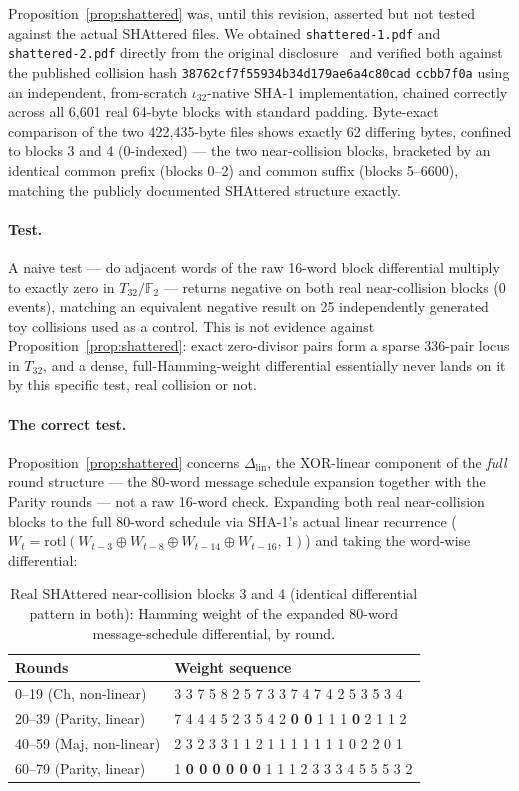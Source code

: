 \documentclass[runningheads]{llncs}
\theoremstyle{plain}
\theoremstyle{definition}
\newcommand{\GFtwo}{\mathbb{F}_2}
\begin{document}
Proposition~\ref{prop:shattered} was, until this revision, asserted but not
tested against the actual SHAttered files. We obtained
\texttt{shattered-1.pdf} and \texttt{shattered-2.pdf} directly from the
original disclosure~\cite{Stevens2017} and verified both against the
published collision hash \texttt{38762cf7f55934b34d179ae6a4c80cad}\allowbreak
\texttt{ccbb7f0a} using an independent, from-scratch $\iota_{32}$-native
SHA-1 implementation, chained correctly across all 6{,}601 real 64-byte
blocks with standard padding. Byte-exact comparison of the two 422{,}435-byte
files shows exactly 62 differing bytes, confined to blocks 3 and 4
(0-indexed) — the two near-collision blocks, bracketed by an identical
common prefix (blocks 0--2) and common suffix (blocks 5--6600), matching
the publicly documented SHAttered structure exactly.

\paragraph{Test.} A naive test — do adjacent words of the raw 16-word block
differential multiply to exactly zero in $T_{32}/\GFtwo$ — returns negative
on both real near-collision blocks (0 events), matching an equivalent
negative result on 25 independently generated toy collisions used as a
control. This is not evidence against Proposition~\ref{prop:shattered}:
exact zero-divisor pairs form a sparse 336-pair locus in $T_{32}$, and a
dense, full-Hamming-weight differential essentially never lands on it by
this specific test, real collision or not.

\paragraph{The correct test.} Proposition~\ref{prop:shattered} concerns
$\Delta_{\mathrm{lin}}$, the XOR-linear component of the \emph{full} round
structure — the 80-word message schedule expansion together with the
Parity rounds — not a raw 16-word check. Expanding both real
near-collision blocks to the full 80-word schedule via SHA-1's actual
linear recurrence ($W_t = \mathrm{rotl}(W_{t-3}\oplus W_{t-8}\oplus
W_{t-14}\oplus W_{t-16},\,1)$) and taking the word-wise differential:

\begin{table}[h]
\centering
\caption{Real SHAttered near-collision blocks 3 and 4 (identical differential
pattern in both): Hamming weight of the expanded 80-word message-schedule
differential, by round.}
\label{tab:shattered-collapse}
\begin{tabular}{lp{9.2cm}}
\toprule
Rounds & Weight sequence \\
\midrule
0--19 (Ch, non-linear)     & 3 3 7 5 8 2 5 7 3 3 7 4 7 4 2 5 3 5 3 4 \\
20--39 (Parity, linear)    & 7 4 4 4 5 2 3 5 4 2 \textbf{0 0} 1 1 1 \textbf{0} 2 1 1 2 \\
40--59 (Maj, non-linear)   & 2 3 2 3 3 1 1 2 1 1 1 1 1 1 1 0 2 2 0 1 \\
60--79 (Parity, linear)    & 1 \textbf{0 0 0 0 0 0} 1 1 1 2 3 3 3 4 5 5 5 3 2 \\
\bottomrule
\end{tabular}
\end{table}
\end{document}
